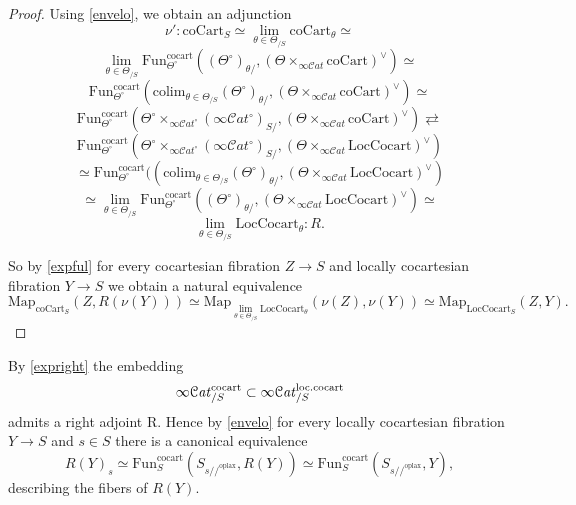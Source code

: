 \documentclass[10pt,oneside]{article}
\numberwithin{equation}{section} %
\numberwithin{figure}{section} %
\theoremstyle{plain}
\theoremstyle{definition}
\newcommand{\R}{{\mathrm R}}
\newcommand{\colim}{\mathrm{colim}}
\newcommand{\Fun}{\mathrm{Fun}}
\newcommand{\cocart}{{\mathrm{cocart}}}
\newcommand{\oplax}{{\mathrm{oplax}}}
\newcommand{\Map}{{\mathrm{Map}}}
\newcommand{\scat}{\mathcal{C}\mathit{at}}
\begin{document}
\begin{proof}
Using \cref{envelo}, we obtain an adjunction
$$ \nu': \mathrm{coCart}_S \simeq \lim_{\theta \in \Theta_{/S}} \mathrm{coCart}_{\theta} \simeq $$$$ \lim_{\theta \in \Theta_{/S}} \Fun^\cocart_{\Theta^\circ}((\Theta^\circ)_{\theta/},(\Theta \times_{\infty\scat} \mathrm{coCart})^\vee) \simeq $$
$$ \Fun^\cocart_{\Theta^\circ}(\colim_{\theta \in \Theta_{/S}} (\Theta^\circ)_{\theta/},(\Theta \times_{\infty\scat} \mathrm{coCart})^\vee) \simeq $$
$$ \Fun^\cocart_{\Theta^\circ}(\Theta^\circ \times_{\infty\scat^\circ} (\infty\scat^\circ)_{S/},(\Theta \times_{\infty\scat} \mathrm{coCart})^\vee) \rightleftarrows $$$$ \Fun^\cocart_{\Theta^\circ}(\Theta^\circ \times_{\infty\scat^\circ} (\infty\scat^\circ)_{S/},(\Theta \times_{\infty\scat} \mathrm{Loc} \mathrm{Cocart})^\vee) $$
$$ \simeq \Fun^\cocart_{\Theta^\circ}((\colim_{\theta \in \Theta_{/S}} (\Theta^\circ)_{\theta/},(\Theta \times_{\infty\scat}  \mathrm{Loc} \mathrm{Cocart})^\vee) $$$$ \simeq \lim_{\theta \in \Theta_{/S}} \Fun^\cocart_{\Theta^\circ}((\Theta^\circ)_{\theta/},(\Theta \times_{\infty\scat} \mathrm{Loc} \mathrm{Cocart})^\vee) \simeq $$$$ \lim_{\theta \in \Theta_{/S}} \mathrm{Loc}\mathrm{Cocart}_\theta: R.$$

So by \cref{expful} for every cocartesian fibration $ Z \to S$ and locally cocartesian fibration $ Y \to S$ we obtain a natural equivalence
$$ \Map_{\mathrm{coCart}_S}(Z,R(\nu(Y))) \simeq \Map_{\lim_{\theta \in \Theta_{/S}} \mathrm{Loc} \mathrm{Cocart}_\theta}(\nu(Z),\nu(Y)) \simeq \Map_{\mathrm{Loc} \mathrm{Cocart}_S}(Z,Y).$$
\end{proof}

\begin{remark}

By \cref{expright} the embedding $$\infty\scat^\cocart_{/S} \subset \infty\scat^{\mathrm{loc}. \vspace{1mm} \cocart}_{/S}$$
admits a right adjoint $\R.$
Hence by \cref{envelo} for every locally cocartesian fibration $Y \to S$ and $s \in S$
there is a canonical equivalence
$$ R(Y)_s \simeq \Fun^\cocart_S(S_{s //^\oplax}, R(Y)) \simeq \Fun^\cocart_S(S_{s //^\oplax}, Y),$$
describing the fibers of $R(Y).$

    
\end{remark}




\end{document}
